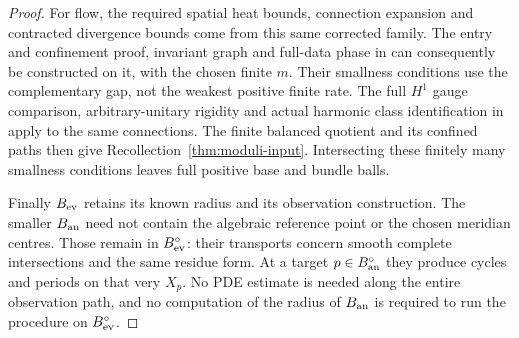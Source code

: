 \begin{proof}
For flow, the required spatial heat bounds, connection
expansion and contracted divergence bounds come from this
same corrected family. The entry and confinement proof,
invariant graph and full-data phase in
\cite[Sections~9--11]{W_HYM} can consequently be constructed
on it, with the chosen finite $m$. Their smallness conditions
use the complementary gap, not the weakest positive finite
rate. The full $H^1$ gauge comparison, arbitrary-unitary
rigidity and actual harmonic class identification in
\cite[Sections~12--13]{W_HYM} apply to the same connections.
The finite balanced quotient and its confined paths then
give Recollection~\ref{thm:moduli-input}. Intersecting these
finitely many smallness conditions leaves full positive
base and bundle balls.

Finally $B_{\rm ev}$ retains its known radius and its
observation construction. The smaller $B_{\rm an}$ need
not contain the algebraic reference point or the chosen
meridian centres. Those remain in $B_{\rm ev}^{\circ}$:
their transports concern smooth complete intersections
and the same residue form. At a target $p\in B_{\rm an}^\circ$
they produce cycles and periods on that very $X_p$.
No PDE estimate is needed along the entire observation
path, and no computation of the radius of $B_{\rm an}$
is required to run the procedure on $B_{\rm ev}^\circ$.
\end{proof}
